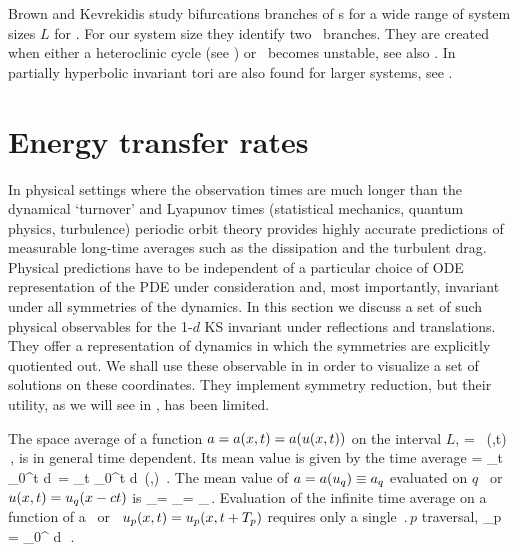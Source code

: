 Brown and Kevrekidis study bifurcations branches
of \rpo s for a wide range of system sizes $L$ for \KSe. For
our system size they identify two \rpo\ branches.
They are
created when either a heteroclinic cycle (see )
or \reqv\ becomes unstable, see also .
In  partially hyperbolic invariant tori are also found
for larger systems, see .

\section{Energy transfer rates}
\label{sec:energy}

In physical settings where the observation times are much longer than
the dynamical `turnover' and Lyapunov times (statistical mechanics,
quantum physics, turbulence) periodic orbit theory provides
highly accurate predictions of measurable long-time averages such as
the dissipation and the turbulent drag. Physical predictions have to be
independent of a particular choice of ODE representation of the PDE
under consideration and, most importantly, invariant under all
symmetries of the dynamics. In this section we discuss a set of such
physical observables for the  1-$d$ KS invariant under reflections and
translations. They offer a representation of dynamics in which the
symmetries are explicitly quotiented out. We shall use these observable in
 in order to visualize a set of solutions on
these coordinates. They implement
symmetry reduction, but their utility, as we will see in ,
has been limited.

The {space average} of a function $a = a(x,t) = a(u(x,t))$  on
the interval $L$,
\beq
    \expct{\obser} = \Lint{\pSpace}\, \obser(\pSpace,t)
    \,,
    \label{rpo:spac_ave}
\eeq
is in general time dependent.
Its mean value is given by the {time average}
\beq
\timeAver{\obser}
    =
\lim_{t\rightarrow \infty}  \int_0^t \! d\tau \, \expct{\obser}
    =
\lim_{t\rightarrow \infty}  \int_0^t \!
    \Lint{\tau}  d\pSpace\, \obser(\pSpace,\tau)
    \,.
\label{rpo:tim_ave}
\eeq
The mean value of $a = a(u_q) \equiv a_q$ evaluated on $q$
\eqv\ or {\reqv} $u(x,t) = u_q(x-ct)$ is
\beq
\timeAver{\obser}_\stagn = \expct{\obser}_\stagn = \obser_\stagn\,.
\label{rpo:u-eqv} \eeq Evaluation of the infinite time average
 on a function of a \po\ or \rpo\
$u_p(x,t)=u_p(x,t+{T_{p}})$ requires only a single
$\period{p}$ traversal,
\beq
  \timeAver{\obser}_p = 
    \int_0^{\period{p}} \! d\tau \, \expct{\obser}
\,.
\label{rpo:u-cyc}
\eeq

